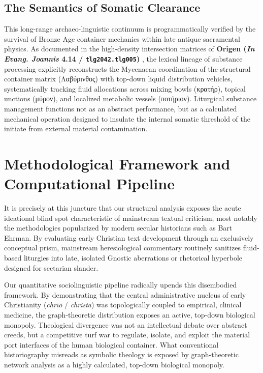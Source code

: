 \documentclass[11pt,twoside,a4paper]{article}
\begin{document}
\subsection{The Semantics of Somatic Clearance}
This long-range archaeo-linguistic continuum is programmatically verified by the survival of Bronze Age container mechanics within late antique sacramental physics. As documented in the high-density intersection matrices of \textbf{Origen (\textit{In Evang. Joannis} 4.14 / \texttt{tlg2042.tlg005})} \cite{origen1899gcs}, the lexical lineage of substance processing explicitly reconstructs the Mycenaean coordination of the structural container matrix (\textgreek{Λαβύρινθος}) with top-down liquid distribution vehicles, systematically tracking fluid allocations across mixing bowls (\textgreek{κρατήρ}), topical unctions (\textgreek{μύρον}), and localized metabolic vessels (\textgreek{ποτήριον}). Liturgical substance management functions not as an abstract performance, but as a calculated mechanical operation designed to insulate the internal somatic threshold of the initiate from external material contamination.


\section{Methodological Framework and Computational Pipeline}
It is precisely at this juncture that our structural analysis exposes the acute ideational blind spot characteristic of mainstream textual criticism, most notably the methodologies popularized by modern secular historians such as Bart Ehrman. By evaluating early Christian text development through an exclusively conceptual prism, mainstream heresiological commentary routinely sanitizes fluid-based liturgies into late, isolated Gnostic aberrations or rhetorical hyperbole designed for sectarian slander. 

Our quantitative sociolinguistic pipeline radically upends this disembodied framework. By demonstrating that the central administrative nucleus of early Christianity (\textit{chrīō} / \textit{christa}) was topologically coupled to empirical, clinical medicine, the graph-theoretic distribution exposes an active, top-down biological monopoly. Theological divergence was not an intellectual debate over abstract creeds, but a competitive turf war to regulate, isolate, and exploit the material port interfaces of the human biological container. What conventional historiography misreads as symbolic theology is exposed by graph-theoretic network analysis as a highly calculated, top-down biological monopoly.
\end{document}
